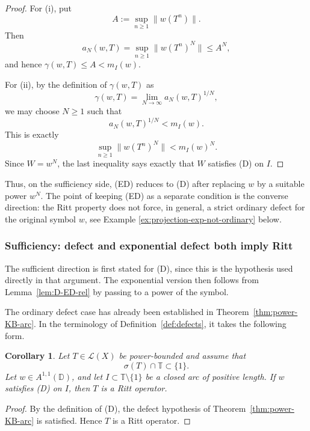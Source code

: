 \documentclass[11pt]{amsart}
\numberwithin{equation}{section}
\newtheorem{corollary}[theorem]{Corollary}
\theoremstyle{definition}
\theoremstyle{plain}
\def\T{\mathbb{T}}
\def\L{L}
\def\D{\mathbb{D}}
\renewcommand{\L}{\mathcal L}
\begin{document}
\begin{proof}
For (i), put
\[
   A:=\sup_{n\ge1}\|w(T^n)\|.
\]
Then
\[
   a_N(w,T)=\sup_{n\ge1}\|w(T^n)^N\|\le A^N,
\]
and hence $\gamma(w,T)\le A<m_I(w)$.

For (ii), by the definition of $\gamma(w,T)$ as
\[
   \gamma(w,T)=\lim_{N\to\infty}a_N(w,T)^{1/N},
\]
we may choose $N\ge1$ such that
\[
   a_N(w,T)^{1/N}<m_I(w).
\]
This is exactly
\[
   \sup_{n\ge1}\|w(T^n)^N\|<m_I(w)^N.
\]
Since $W=w^N$, the last inequality says exactly that $W$ satisfies
\textup{(D)} on $I$.
\end{proof}
Thus, on the sufficiency side, \textup{(ED)} reduces to \textup{(D)}
after replacing \(w\) by a suitable power \(w^N\).  The point of keeping
\textup{(ED)} as a separate condition is the converse direction: the Ritt
property does not force, in general, a strict ordinary defect for the original
symbol \(w\), see Example  \ref{ex:projection-exp-not-ordinary} below.

\subsubsection{Sufficiency: defect and exponential defect both imply Ritt}

The sufficient direction is first stated for \textup{(D)}, since this is the
hypothesis used directly in that argument. The exponential version then follows
from Lemma~\ref{lem:D-ED-rel} by passing to a power of the symbol.


The ordinary defect case has already been established in
Theorem~\ref{thm:power-KB-arc}. In the terminology of
Definition~\ref{def:defects}, it takes the following form.

\begin{corollary}\label{cor:KB-defect-suff}
Let $T\in\L(X)$ be power-bounded and assume that
\[
  \sigma(T)\cap\T\subset\{1\}.
\]
Let $w\in A^{1,1}(\D)$, and let
$I\subset\T\setminus\{1\}$ be a closed arc of positive length.
If $w$ satisfies \textup{(D)} on $I$, then $T$ is a Ritt operator.
\end{corollary}

\begin{proof}
By the definition of \textup{(D)}, the defect hypothesis of
Theorem~\ref{thm:power-KB-arc} is satisfied. Hence $T$ is a Ritt operator.
\end{proof}


\end{document}
